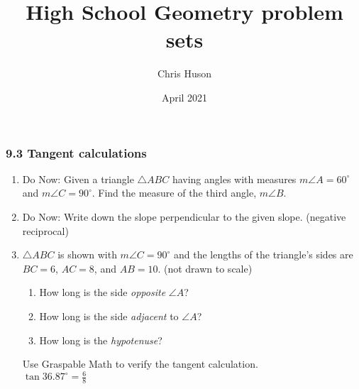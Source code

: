 \documentclass[12pt, twoside]{article}
\title{High School Geometry problem sets}
\author{Chris Huson}
\date{April 2021}
\begin{document}
\subsubsection*{9.3 Tangent calculations}
\begin{enumerate}
\item Do Now: Given a triangle $\triangle ABC$ having angles with measures $m\angle A = 60^\circ$ and $m\angle C = 90^\circ$. Find the measure of the third angle, $m\angle B$.

\newpage
\item Do Now: Write down the slope perpendicular to the given slope. (negative reciprocal) \vspace{0.5cm}
\begin{enumerate}
\end{enumerate}

\newpage
\item $\triangle ABC$ is shown with $m\angle C=90^\circ$ and the lengths of the triangle's sides are $BC=6$, $AC=8$, and $AB=10$. (not drawn to scale)
  \begin{multicols}{2}
    \begin{enumerate}
      \item How long is the side \emph{opposite} $\angle A$? \vspace{0.75cm}
      \item How long is the side \emph{adjacent} to $\angle A$? \vspace{0.75cm}
      \item How long is the \emph{hypotenuse}? \vspace{0.75cm}
    \end{enumerate}
    \end{multicols}
    Use Graspable Math to verify the tangent calculation.\\[0.25cm]
      $\displaystyle \tan 36.87^\circ = \frac{6}{8}$


\end{enumerate}
\end{document}
